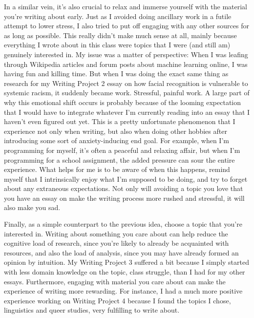 \documentclass[12pt, letterpaper]{article}
\begin{document}
\begin{mla}
In a similar vein, it's also crucial to relax and immerse yourself with the
material you're writing about early. Just as I avoided doing ancillary work in
a futile attempt to lower stress, I also tried to put off engaging with any
other sources for as long as possible. This really didn't make much sense at
all, mainly because everything I wrote about in this class were topics that I
were (and still am) genuinely interested in. My issue was a matter of
perspective: When I was leafing through Wikipedia articles and forum posts
about machine learning online, I was having fun and killing time. But when I
was doing the exact same thing as research for my Writing Project 2 essay on
how facial recognition is vulnerable to systemic racism, it suddenly became
work. Stressful, painful work. A large part of why this emotional shift
occurs is probably because of the looming expectation that I would have to
integrate whatever I'm currently reading into an essay that I haven't even
figured out yet. This is a pretty unfortunate phenomenon that I experience
not only when writing, but also when doing other hobbies after introducing
some sort of anxiety-inducing end goal. For example, when I'm programming for
myself, it's often a peaceful and relaxing affair, but when I'm programming
for a school assignment, the added pressure can sour the entire experience.
What helps for me is to be aware of when this happens, remind myself that I
intrinsically enjoy what I'm supposed to be doing, and try to forget about
any extraneous expectations. Not only will avoiding a topic you love that you
have an essay on make the writing process more rushed and stressful, it will
also make you sad.

Finally, as a simple counterpart to the previous idea, choose a topic that
you're interested in. Writing about something you care about can help reduce
the cognitive load of research, since you're likely to already be acquainted
with resources, and also the load of analysis, since you may have already
formed an opinion by intuition. My Writing Project 3 suffered a bit because I
simply started with less domain knowledge on the topic, class struggle, than I
had for my other essays. Furthermore, engaging with material you care about
can make the experience of writing more rewarding. For instance, I had a much
more positive experience working on Writing Project 4 because I found the
topics I chose, linguistics and queer studies, very fulfilling to write about.


\end{mla}
\end{document}
